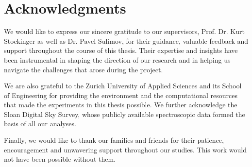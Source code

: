 \section{Acknowledgments}
\label{sec:acknowledgments}

We would like to express our sincere gratitude to our supervisors, Prof. Dr. Kurt Stockinger as well as Dr. Pavel Sulimov, for their guidance, valuable feedback and support throughout the course of this thesis. Their expertise and insights have been instrumental in shaping the direction of our research and in helping us navigate the challenges that arose during the project.

We are also grateful to the Zurich University of Applied Sciences and its School of Engineering for providing the environment and the computational resources that made the experiments in this thesis possible. We further acknowledge the Sloan Digital Sky Survey, whose publicly available spectroscopic data formed the basis of all our analyses.

Finally, we would like to thank our families and friends for their patience, encouragement and unwavering support throughout our studies. This work would not have been possible without them.
